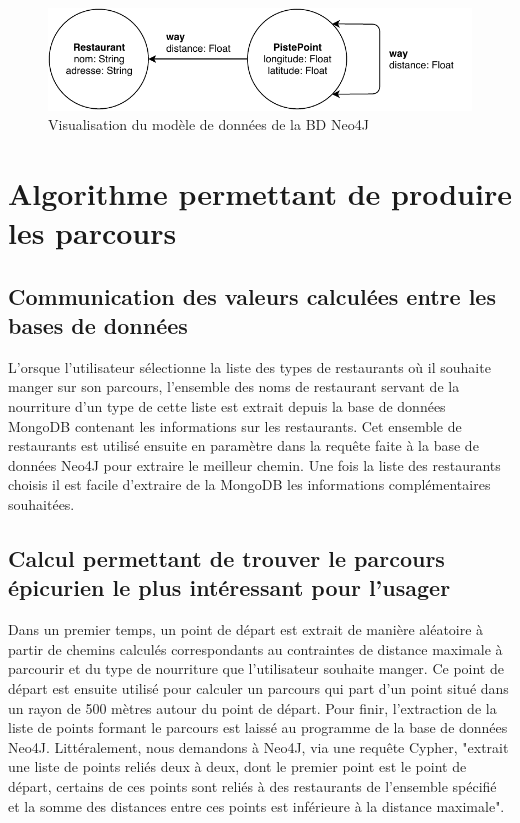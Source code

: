 \documentclass[12pt]{article}
\begin{document}
    \begin{figure}[h]
        \centering
        \includegraphics[scale=1]{images/actual_neo_model.pdf}
        \caption{\label{actual_neo_model} Visualisation du modèle de données de la BD Neo4J}
    \end{figure}

\section{Algorithme permettant de produire les parcours}

\subsection{Communication des valeurs calculées entre les bases de données}

    L'orsque l'utilisateur sélectionne la liste des types de restaurants où il souhaite manger sur son parcours, l'ensemble des noms de restaurant servant de la nourriture d'un type de cette liste est extrait depuis la base de données MongoDB contenant les informations sur les restaurants. Cet ensemble de restaurants est utilisé ensuite en paramètre dans la requête faite à la base de données Neo4J pour extraire le meilleur chemin.
    Une fois la liste des restaurants choisis il est facile d'extraire de la MongoDB les informations complémentaires souhaitées.

\subsection{Calcul permettant de trouver le parcours épicurien le plus intéressant pour l'usager}

    Dans un premier temps, un point de départ est extrait de manière aléatoire à partir de chemins calculés correspondants au contraintes de distance maximale à parcourir et du type de nourriture que l'utilisateur souhaite manger.
    Ce point de départ est ensuite utilisé pour calculer un parcours qui part d'un point situé dans un rayon de 500 mètres autour du point de départ. Pour finir, l'extraction de la liste de points formant le parcours est laissé au programme de la base de données Neo4J. Littéralement, nous demandons à Neo4J, via une requête Cypher, "extrait une liste de points reliés deux à deux, dont le premier point est le point de départ, certains de ces points sont reliés à des restaurants de l'ensemble spécifié et la somme des distances entre ces points est inférieure à la distance maximale".  
\end{document}
